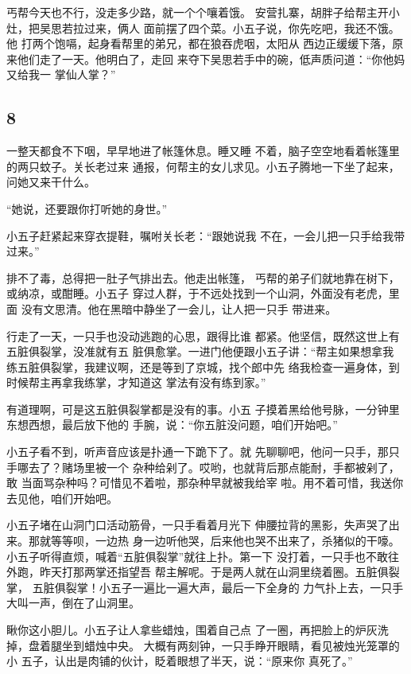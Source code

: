 丐帮今天也不行，没走多少路，就一个个嚷着饿。
安营扎寨，胡胖子给帮主开小灶，把吴思若拉过来，俩人
面前摆了四个菜。小五子说，你先吃吧，我还不饿。他
打两个饱嗝，起身看帮里的弟兄，都在狼吞虎咽，太阳从
西边正缓缓下落，原来他们走了一天。他明白了，走回
来夺下吴思若手中的碗，低声质问道：“你他妈又给我一
掌仙人掌？”
\newline

{\centering\subsection{8}}

一整天都食不下咽，早早地进了帐篷休息。睡又睡
不着，脑子空空地看着帐篷里的两只蚊子。关长老过来
通报，何帮主的女儿求见。小五子腾地一下坐了起来，
问她又来干什么。

“她说，还要跟你打听她的身世。”

小五子赶紧起来穿衣提鞋，嘱咐关长老：“跟她说我
不在，一会儿把一只手给我带过来。”

排不了毒，总得把一肚子气排出去。他走出帐篷，
丐帮的弟子们就地靠在树下，或纳凉，或酣睡。小五子
穿过人群，于不远处找到一个山洞，外面没有老虎，里面
没有文思清。他在黑暗中静坐了一会儿，让人把一只手
带进来。

行走了一天，一只手也没动逃跑的心思，跟得比谁
都紧。他坚信，既然这世上有五脏俱裂掌，没准就有五
脏俱愈掌。一进门他便跟小五子讲：“帮主如果想拿我
练五脏俱裂掌，我建议啊，还是等到了京城，找个郎中先
络我检查一遍身体，到时候帮主再拿我练掌，才知道这
掌法有没有练到家。”

有道理啊，可是这五脏俱裂掌都是没有的事。小五
子摸着黑给他号脉，一分钟里东想西想，最后放下他的
手腕，说：“你五脏没问题，咱们开始吧。”

小五子看不到，听声音应该是扑通一下跪下了。就
先聊聊吧，他问一只手，那只手哪去了？赌场里被一个
杂种给剁了。哎哟，也就背后那点能耐，手都被剁了，敢
当面骂杂种吗？可惜见不着啦，那杂种早就被我给宰
啦。用不着可惜，我送你去见他，咱们开始吧。

小五子堵在山洞门口活动筋骨，一只手看着月光下
伸腰拉背的黑影，失声哭了出来。那就等等呗，一边热
身一边听他哭，后来他也哭不出来了，杀猪似的干嚎。
小五子听得直烦，喊着“五脏俱裂掌”就往上扑。第一下
没打着，一只手也不敢往外跑，昨天打那两掌还指望吾
帮主解呢。于是两人就在山洞里绕着圈。五脏俱裂掌，
五脏俱裂掌！小五子一遍比一遍大声，最后一下全身的
力气扑上去，一只手大叫一声，倒在了山洞里。

瞅你这小胆儿。小五子让人拿些蜡烛，围着自己点
了一圈，再把脸上的炉灰洗掉，盘着腿坐到蜡烛中央。
大概有两刻钟，一只手睁开眼睛，看见被烛光笼罩的小
五子，认出是肉铺的伙计，眨着眼想了半天，说：“原来你
真死了。”

